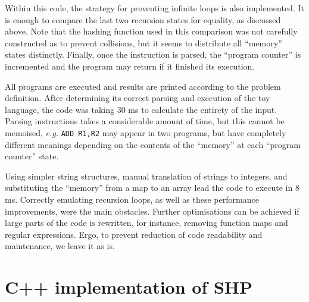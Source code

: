 \documentclass[12pt]{article}
\begin{document}
Within this code, the strategy for preventing infinite loops is also implemented. It is enough to compare the last two recursion states for equality, as discussed above. Note that the hashing function used in this comparison was not carefully constructed as to prevent collisions, but it seems to distribute all ``memory'' states distinctly. Finally, once the instruction is parsed, the ``program counter'' is incremented and the program may return if it finished its execution.

All programs are executed and results are printed according to the problem definition. After determining its correct parsing and execution of the toy language, the code was taking $30$ ms to calculate the entirety of the input. Parsing instructions takes a considerable amount of time, but this cannot be memoised, \emph{e.g.} \texttt{ADD R1,R2} may appear in two programs, but have completely different meanings depending on the contents of the ``memory'' at each ``program counter'' state.

Using simpler string structures, manual translation of strings to integers, and substituting the ``memory'' from a map to an array lead the code to execute in $8$ ms. Correctly emulating recursion loops, as well as these performance improvements, were the main obstacles. Further optimisations can be achieved if large parts of the code is rewritten, for instance, removing function maps and regular expressions. Ergo, to prevent reduction of code readability and maintenance, we leave it as is.




\appendix

\section{C++ implementation of SHP}\label{app:impl}

\end{document}
